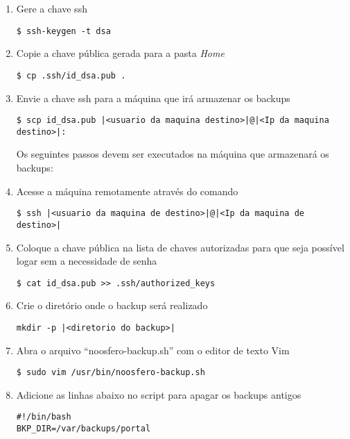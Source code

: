 \begin{enumerate}[label=\alph*)]

\item Gere a chave ssh
\begin{lstlisting}
$ ssh-keygen -t dsa
\end{lstlisting}

\item Copie a chave pública gerada para a pasta \emph{Home}
\begin{lstlisting}
$ cp .ssh/id_dsa.pub .
\end{lstlisting}

\item Envie a chave ssh para a máquina que irá armazenar os backups
\begin{lstlisting}[style=base]
$ scp id_dsa.pub |<usuario da maquina destino>|@|<Ip da maquina destino>|:
\end{lstlisting}

Os seguintes passos devem ser executados na máquina que armazenará os backups:

\item Acesse a máquina remotamente através do comando
\begin{lstlisting}[style=base]
$ ssh |<usuario da maquina de destino>|@|<Ip da maquina de destino>|
\end{lstlisting}

\item Coloque a chave pública na lista de chaves autorizadas para que seja possível logar sem a necessidade de senha
\begin{lstlisting}
$ cat id_dsa.pub >> .ssh/authorized_keys
\end{lstlisting}

\item Crie o diretório onde o backup será realizado
\begin{lstlisting}[style=base]
mkdir -p |<diretorio do backup>|
\end{lstlisting}

\item Abra o arquivo “noosfero-backup.sh” com o editor de texto Vim
\begin{lstlisting}
$ sudo vim /usr/bin/noosfero-backup.sh
\end{lstlisting}

\item Adicione as linhas abaixo no script para apagar os backups antigos
\begin{lstlisting}
#!/bin/bash
BKP_DIR=/var/backups/portal


\end{lstlisting}
\end{enumerate}
